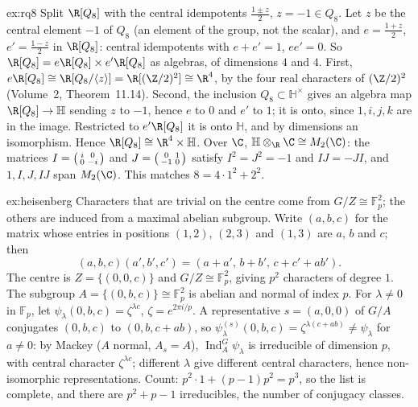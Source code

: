 \begin{solution}{ex:rq8}
\idea Split $\R[Q_8]$ with the central idempotents $\frac{1\pm z}2$, $z=-1\in Q_8$.
\writeup Let $z$ be the central element $-1$ of $Q_8$ (an element of the group, not the scalar), and $e=\frac{1+z}2$, $e'=\frac{1-z}2$ in $\R[Q_8]$: central idempotents with $e+e'=1$, $ee'=0$. So $\R[Q_8]=e\R[Q_8]\times e'\R[Q_8]$ as
algebras, of dimensions $4$ and $4$. First, $e\R[Q_8]\cong\R[Q_8/\langle z\rangle]=\R[(\Z/2)^2]\cong\R^4$, by the four real characters of $(\Z/2)^2$ (Volume~2, Theorem~11.14). Second, the inclusion $Q_8\subset\mathbb H^\times$ gives an algebra map
$\R[Q_8]\to\mathbb H$ sending $z$ to $-1$, hence $e$ to $0$ and $e'$ to $1$; it is onto, since $1,i,j,k$ are in the image. Restricted to $e'\R[Q_8]$ it is onto $\mathbb H$, and by dimensions an isomorphism. Hence $\R[Q_8]\cong\R^4\times\mathbb H$.
Over $\C$, $\mathbb H\otimes_\R\C\cong M_2(\C)$: the matrices $I=\begin{psmallmatrix}i&0\\0&-i\end{psmallmatrix}$ and $J=\begin{psmallmatrix}0&1\\-1&0\end{psmallmatrix}$ satisfy $I^2=J^2=-1$ and $IJ=-JI$, and $1,I,J,IJ$ span $M_2(\C)$. This matches
$8=4\cdot1^2+2^2$.
\end{solution}

\begin{solution}{ex:heisenberg}
\idea Characters that are trivial on the centre come from $G/Z\cong\mathbb F_p^2$; the others are induced from a maximal abelian subgroup.
\writeup Write $(a,b,c)$ for the matrix whose entries in positions $(1,2)$, $(2,3)$ and $(1,3)$ are $a$, $b$ and $c$; then
\[
(a,b,c)(a',b',c')=(a+a',\,b+b',\,c+c'+ab').
\] The centre is $Z=\{(0,0,c)\}$ and $G/Z\cong\mathbb F_p^2$, giving $p^2$ characters of degree $1$.
The subgroup $A=\{(0,b,c)\}\cong\mathbb F_p^2$ is abelian and normal of index $p$. For $\lambda\ne0$ in $\mathbb F_p$, let $\psi_\lambda(0,b,c)=\zeta^{\lambda c}$, $\zeta=e^{2\pi i/p}$. A representative $s=(a,0,0)$ of $G/A$ conjugates $(0,b,c)$ to $(0,b,c+ab)$, so
$\psi_\lambda^{(s)}(0,b,c)=\zeta^{\lambda(c+ab)}\ne\psi_\lambda$ for $a\ne0$: by Mackey ($A$ normal, $A_s=A$), $\operatorname{Ind}_A^G\psi_\lambda$ is irreducible of dimension $p$, with central character $\zeta^{\lambda c}$; different $\lambda$ give
different central characters, hence non-isomorphic representations. Count: $p^2\cdot1+(p-1)p^2=p^3$, so the list is complete, and there are $p^2+p-1$ irreducibles, the number of conjugacy classes.
\end{solution}

